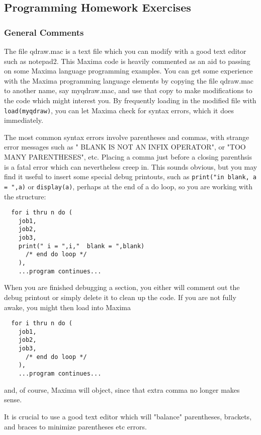 \documentclass[12pt]{article}
\begin{document}
\newpage
\subsection{Programming Homework Exercises}
\subsubsection{General Comments}
The file qdraw.mac is a text file which you can modify with a good text editor
  such as notepad2.
This Maxima code is heavily commented as an aid to passing on some Maxima
  language programming examples.
You can get some experience with the Maxima programming language elements by
  copying the file qdraw.mac to another name, say myqdraw.mac, and use
  that copy to make modifications to the code which might interest you.
By frequently loading in the modified file with \verb|load(myqdraw)|, you can
  let Maxima check for syntax errors, which it does immediately.
  
  \smallskip
  
The most common syntax errors involve parentheses and commas, with strange
  error messages such as " BLANK IS NOT AN INFIX OPERATOR", or "TOO MANY PARENTHESES", etc.
Placing a comma just before a closing parenthsis is a fatal error which
  can nevertheless creep in.
This sounds obvious, but you may find it useful to insert some special debug
  printouts, such as \verb|print("in blank, a = ",a)| or \verb|display(a)|, perhaps
  at the end of a do loop, so you are working with the structure:\\
\small
\begin{verbatim}
  for i thru n do (
    job1,
    job2,
    job3,
	print(" i = ",i,"  blank = ",blank)
	  /* end do loop */
	),
	...program continues...

\end{verbatim}
\normalsize
When you are finished debugging a section, you either will comment out the
  debug printout or simply delete it to clean up the code.
If you are not fully awake, you might then load into Maxima
\small
\begin{verbatim}
  for i thru n do (
    job1,
    job2,
    job3,
      /* end do loop */
	),
	...program continues...

\end{verbatim}
\normalsize
and, of course, Maxima will object, since that extra comma no longer
  makes sense.
  
 \smallskip
 
It is crucial to use a good text editor which will "balance" parentheses, brackets,
  and braces to minimize parentheses etc errors.
\end{document}
